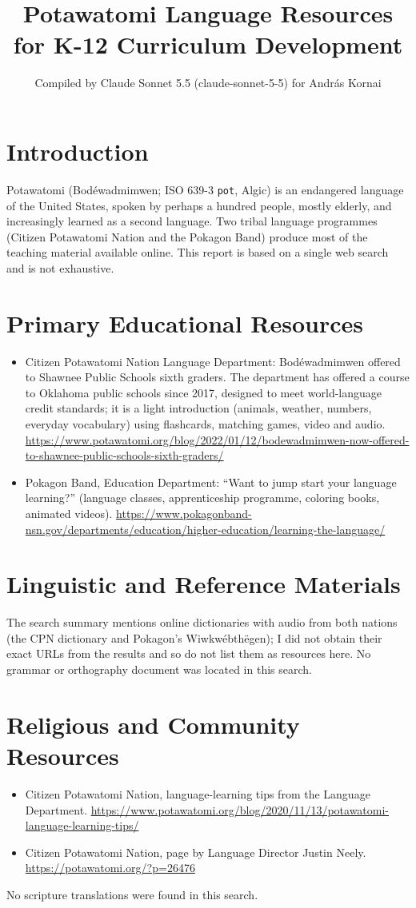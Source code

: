\documentclass[12pt]{article}
\title{Potawatomi Language Resources for K-12 Curriculum Development}
\author{Compiled by Claude Sonnet 5.5 (claude-sonnet-5-5) for Andr\'as Kornai}
\date{}
\begin{document}
\maketitle

\section{Introduction}
Potawatomi (Bod\'ewadmimwen; ISO 639-3 \texttt{pot}, Algic) is an endangered language of the United States, spoken by perhaps a hundred people, mostly elderly, and increasingly learned as a second language. Two tribal language programmes (Citizen Potawatomi Nation and the Pokagon Band) produce most of the teaching material available online. This report is based on a single web search and is not exhaustive.

\section{Primary Educational Resources}
\begin{itemize}
\item Citizen Potawatomi Nation Language Department: Bod\'ewadmimwen offered to Shawnee Public Schools sixth graders. The department has offered a course to Oklahoma public schools since 2017, designed to meet world-language credit standards; it is a light introduction (animals, weather, numbers, everyday vocabulary) using flashcards, matching games, video and audio. \url{https://www.potawatomi.org/blog/2022/01/12/bodewadmimwen-now-offered-to-shawnee-public-schools-sixth-graders/}
\item Pokagon Band, Education Department: ``Want to jump start your language learning?'' (language classes, apprenticeship programme, coloring books, animated videos). \url{https://www.pokagonband-nsn.gov/departments/education/higher-education/learning-the-language/}
\end{itemize}

\section{Linguistic and Reference Materials}
The search summary mentions online dictionaries with audio from both nations (the CPN dictionary and Pokagon's Wiwkw\'ebth\"egen); I did not obtain their exact URLs from the results and so do not list them as resources here. No grammar or orthography document was located in this search.

\section{Religious and Community Resources}
\begin{itemize}
\item Citizen Potawatomi Nation, language-learning tips from the Language Department. \url{https://www.potawatomi.org/blog/2020/11/13/potawatomi-language-learning-tips/}
\item Citizen Potawatomi Nation, page by Language Director Justin Neely. \url{https://potawatomi.org/?p=26476}
\end{itemize}
No scripture translations were found in this search.
\end{document}
